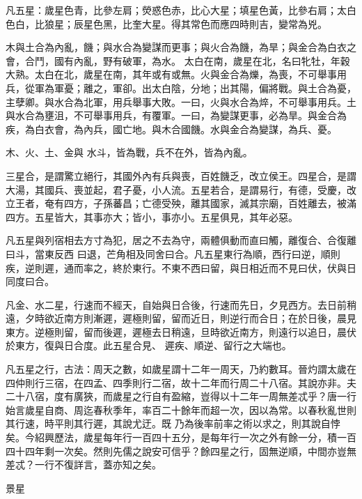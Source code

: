\begin{pinyinscope}
 凡五星：歲星色青，比參左肩；熒惑色赤，比心大星；填星色黃，比參右肩；太白色白，比狼星；辰星色黑，比奎大星。得其常色而應四時則吉，變常為兇。



 木與土合為內亂，饑；與水合為變謀而更事；與火合為饑，為旱；與金合為白衣之會，合鬥，國有內亂，野有破軍，為水。
 太白在南，歲星在北，名曰牝牡，年穀大熟。太白在北，歲星在南，其年或有或無。火與金合為爍，為喪，不可舉事用兵，從軍為軍憂；離之，軍卻。出太白陰，分地；出其陽，偏將戰。與土合為憂，主孽卿。與水合為北軍，用兵舉事大敗。一曰，火與水合為焠，不可舉事用兵。土與水合為壅沮，不可舉事用兵，有覆軍。一曰，為變謀更事，必為旱。與金合為疾，為白衣會，為內兵，國亡地。與木合國饑。水與金合為變謀，為兵、憂。



 木、火、土、金與
 水斗，皆為戰，兵不在外，皆為內亂。



 三星合，是謂驚立絕行，其國外內有兵與喪，百姓饑乏，改立侯王。四星合，是謂大湯，其國兵、喪並起，君子憂，小人流。五星若合，是謂易行，有德，受慶，改立王者，奄有四方，子孫蕃昌；亡德受殃，離其國家，滅其宗廟，百姓離去，被滿四方。五星皆大，其事亦大；皆小，事亦小。五星俱見，其年必惡。



 凡五星與列宿相去方寸為犯，居之不去為守，兩體俱動而直曰觸，離復合、合復離曰斗，當東反西
 曰退，芒角相及同舍曰合。凡五星東行為順，西行曰逆，順則疾，逆則遲，通而率之，終於東行。不東不西曰留，與日相近而不見曰伏，伏與日同度曰合。



 凡金、水二星，行速而不經天，自始與日合後，行速而先日，夕見西方。去日前稍遠，夕時欲近南方則漸遲，遲極則留，留而近日，則逆行而合日；在於日後，晨見東方。逆極則留，留而後遲，遲極去日稍遠，旦時欲近南方，則遠行以追日，晨伏於東方，復與日合度。此五星合見、
 遲疾、順逆、留行之大端也。



 凡五星之行，古法：周天之數，如歲星謂十二年一周天，乃約數耳。晉灼謂太歲在四仲則行三宿，在四孟、四季則行二宿，故十二年而行周二十八宿。其說亦非。夫二十八宿，度有廣狹，而歲星之行自有盈縮，豈得以十二年一周無差忒乎？唐一行始言歲星自商、周迄春秋季年，率百二十餘年而超一次，因以為常。以春秋亂世則其行速，時平則其行遲，其說尤迂。既
 乃為後率前率之術以求之，則其說自悖矣。今紹興歷法，歲星每年行一百四十五分，是每年行一次之外有餘一分，積一百四十四年剩一次矣。然則先儒之說安可信乎？餘四星之行，固無逆順，中間亦豈無差忒？一行不復詳言，蓋亦知之矣。



 景星




\end{pinyinscope}
